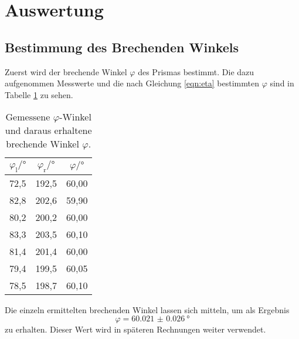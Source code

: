 \section{Auswertung}
\label{sec:Auswertung}
\subsection{Bestimmung des Brechenden Winkels}
\label{subsec:brechwinkel}
Zuerst wird der brechende Winkel $\varphi$ des Prismas bestimmt.
Die dazu aufgenommen Messwerte und die nach Gleichung \eqref{eqn:eta}
bestimmten $\varphi$ sind in Tabelle \ref{tab:phi} zu sehen.

\begin{table}[htp]
	\begin{center}
    \caption{Gemessene $\varphi$-Winkel und daraus erhaltene brechende Winkel $\varphi$.}
    \label{tab:phi}
		\begin{tabular}{ccc}
		\toprule
			{$\varphi_\text{l}/°$} & {$\varphi_\text{r}/°$} & {$\varphi/°$} \\
			\midrule
      72,5 & 192,5 & 60,00 \\
      82,8 & 202,6 & 59,90 \\
      80,2 & 200,2 & 60,00 \\
      83,3 & 203,5 & 60,10 \\
      81,4 & 201,4 & 60,00 \\
      79,4 & 199,5 & 60,05 \\
      78,5 & 198,7 & 60,10 \\
		\bottomrule
		\end{tabular}
	\end{center}
\end{table}

Die einzeln ermittelten brechenden Winkel lassen sich mitteln, um als Ergebnis %
\begin{equation*}
  \varphi = \SI{60.021(26)}{\degree}
\end{equation*}
zu erhalten. Dieser Wert wird in späteren Rechnungen weiter verwendet.

